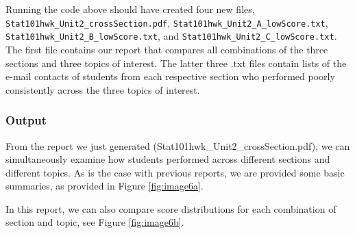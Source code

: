 \documentclass{article}\usepackage[]{graphicx}\usepackage[]{color}
\numberwithin{equation}{section} %
\begin{document}
Running the code above should have created four new files, \texttt{Stat101hwk\_Unit2\_crossSection.pdf}, \texttt{Stat101hwk\_Unit2\_A\_lowScore.txt}, \texttt{Stat101hwk\_Unit2\_B\_lowScore.txt}, and \texttt{Stat101hwk\_Unit2\_C\_lowScore.txt}. The first file contains our report that compares all combinations of the three sections and three topics of interest. The latter three .txt files contain lists of the e-mail contacts of students from each respective section who performed poorly consistently across the three topics of interest.

\subsubsection{Output}

From the report we just generated (Stat101hwk\_Unit2\_crossSection.pdf), we can simultaneously examine how students performed across different sections and different topics. As is the case with previous reports, we are provided some basic summaries, as provided in Figure \ref{fig:image6a}.

\begin{center}
\captionsetup{width=0.5\textwidth}
\label{fig:image6a}
\end{center}

In this report, we can also compare score distributions for each combination of section and topic, see Figure \ref{fig:image6b}.

\begin{center}
\captionsetup{width=0.9\textwidth}
\label{fig:image6b}
\end{center}
\end{document}

